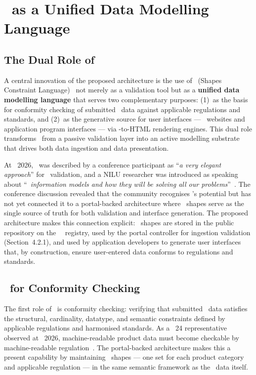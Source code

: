 \section{\SHACL\ as a Unified Data Modelling Language}

\subsection{The Dual Role of \SHACL}

A central innovation of the proposed architecture is the use of \SHACL\ (Shapes
Constraint Language)~\cite{shacl_spec} not merely as a validation tool but as a
\textbf{unified data modelling language} that serves two complementary purposes:
(1)~as the basis for conformity checking of submitted \DPP\ data against
applicable regulations and standards, and (2)~as the generative source for user
interfaces --- \DPP\ websites and application program interfaces --- via
\SHACL-to-HTML rendering engines. This dual role transforms \SHACL\ from a
passive validation layer into an active modelling substrate that drives both
data ingestion and data presentation.

At \DPPforEU~2026, \SHACL\ was described by a conference participant as
``\textit{a very elegant approach}'' for \DPP\ validation, and a NILU researcher
was introduced as speaking about ``\textit{\SHACL\ information models and how
they will be solving all our problems}''~\cite{dpp4eu2026_day1}. The conference
discussion revealed that the community recognises \SHACL's potential but has not
yet connected it to a portal-backed architecture where \SHACL\ shapes serve as
the single source of truth for both validation and interface generation. The
proposed architecture makes this connection explicit: \SHACL\ shapes are stored
in the public repository on the \EC\ \DPP\ registry, used by the portal
controller for ingestion validation (Section~4.2.1), and used by application
developers to generate user interfaces that, by construction, ensure
user-entered data conforms to regulations and standards.

\subsection{\SHACL\ for Conformity Checking}

The first role of \SHACL\ is conformity checking: verifying that submitted \DPP\
data satisfies the structural, cardinality, datatype, and semantic constraints
defined by applicable regulations and harmonised standards. As a \JTC~24
representative observed at \DPPforEU~2026, machine-readable product data must
become checkable by machine-readable regulation~\cite{dpp4eu2026_day1}. The
portal-backed architecture makes this a present capability by maintaining
\SHACL\ shapes --- one set for each product category and applicable regulation
--- in the same semantic framework as the \DPP\ data itself.

